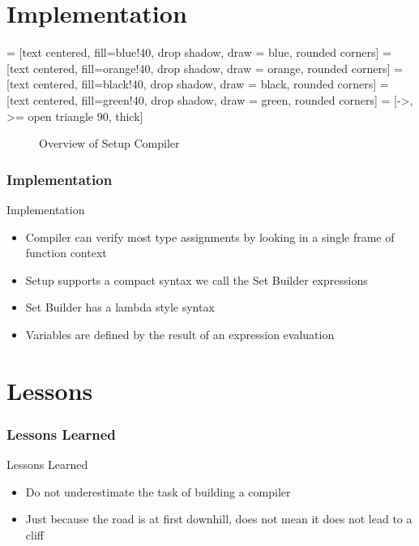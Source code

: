 \documentclass{beamer}
\begin{document}
\section*{Implementation}
 = [text centered, fill=blue!40, drop shadow, draw = blue, rounded corners]
 = [text centered, fill=orange!40, drop shadow, draw = orange, rounded corners]
 = [text centered, fill=black!40, drop shadow, draw = black, rounded corners]
 = [text centered, fill=green!40, drop shadow, draw = green, rounded corners]
 = [->, >= open triangle 90, thick]
\begin{frame}
\begin{figure}[h]
\label{arch}
\caption{Overview of Setup Compiler}
\end{figure}
\end{frame}

\begin{frame}
\frametitle{Implementation}
\begin{block}{Implementation}
\begin{itemize}
\item Compiler can verify most type assignments by looking in a single frame of function context 
\item Setup supports a compact syntax we call the Set Builder expressions
\item Set Builder has a lambda style syntax 
\item Variables are defined by the result of an expression evaluation
\end{itemize}
\end{block}
\end{frame}

\section*{Lessons}
\begin{frame}
\frametitle{Lessons Learned}
\begin{block}{Lessons Learned}
\begin{itemize}
	\item Do not underestimate the task of building a compiler
	\item Just because the road is at first downhill, does not mean it does not lead to a cliff
\end{itemize}
\end{block}
\end{frame}
\end{document}
